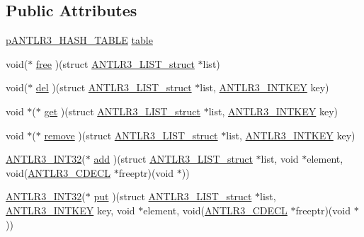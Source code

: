 \subsection*{Public Attributes}
\begin{DoxyCompactItemize}
\item 
\hyperlink{antlr3interfaces_8h_a8fd297514ac4bb022d25b65da9954adb}{p\-A\-N\-T\-L\-R3\-\_\-\-H\-A\-S\-H\-\_\-\-T\-A\-B\-L\-E} \hyperlink{struct_a_n_t_l_r3___l_i_s_t__struct_a15b368e87b7d31281b6f8c45abdbbe49}{table}
\item 
void($\ast$ \hyperlink{struct_a_n_t_l_r3___l_i_s_t__struct_a40cf49789eec6942fd248cb21f5c19ec}{free} )(struct \hyperlink{struct_a_n_t_l_r3___l_i_s_t__struct}{A\-N\-T\-L\-R3\-\_\-\-L\-I\-S\-T\-\_\-struct} $\ast$list)
\item 
void($\ast$ \hyperlink{struct_a_n_t_l_r3___l_i_s_t__struct_a5f19ce534e2425ed9e4e1f4ca35d198a}{del} )(struct \hyperlink{struct_a_n_t_l_r3___l_i_s_t__struct}{A\-N\-T\-L\-R3\-\_\-\-L\-I\-S\-T\-\_\-struct} $\ast$list, \hyperlink{antlr3defs_8h_aa5533fd558adc28dc2af0039f52324a8}{A\-N\-T\-L\-R3\-\_\-\-I\-N\-T\-K\-E\-Y} key)
\item 
void $\ast$($\ast$ \hyperlink{struct_a_n_t_l_r3___l_i_s_t__struct_ae8b4a02c7bb9cd4921cef90fd5e7a304}{get} )(struct \hyperlink{struct_a_n_t_l_r3___l_i_s_t__struct}{A\-N\-T\-L\-R3\-\_\-\-L\-I\-S\-T\-\_\-struct} $\ast$list, \hyperlink{antlr3defs_8h_aa5533fd558adc28dc2af0039f52324a8}{A\-N\-T\-L\-R3\-\_\-\-I\-N\-T\-K\-E\-Y} key)
\item 
void $\ast$($\ast$ \hyperlink{struct_a_n_t_l_r3___l_i_s_t__struct_a6055530ad64fac8d110fd3ea3c5b9f9b}{remove} )(struct \hyperlink{struct_a_n_t_l_r3___l_i_s_t__struct}{A\-N\-T\-L\-R3\-\_\-\-L\-I\-S\-T\-\_\-struct} $\ast$list, \hyperlink{antlr3defs_8h_aa5533fd558adc28dc2af0039f52324a8}{A\-N\-T\-L\-R3\-\_\-\-I\-N\-T\-K\-E\-Y} key)
\item 
\hyperlink{antlr3defs_8h_a6faef5c4687f8eb633d2aefea93973ca}{A\-N\-T\-L\-R3\-\_\-\-I\-N\-T32}($\ast$ \hyperlink{struct_a_n_t_l_r3___l_i_s_t__struct_a65dd3a65b4b1582ca87178300b030a77}{add} )(struct \hyperlink{struct_a_n_t_l_r3___l_i_s_t__struct}{A\-N\-T\-L\-R3\-\_\-\-L\-I\-S\-T\-\_\-struct} $\ast$list, void $\ast$element, void(\hyperlink{antlr3defs_8h_a91c919dd260a95cc88a0cd9b5c0a11cc}{A\-N\-T\-L\-R3\-\_\-\-C\-D\-E\-C\-L} $\ast$freeptr)(void $\ast$))
\item 
\hyperlink{antlr3defs_8h_a6faef5c4687f8eb633d2aefea93973ca}{A\-N\-T\-L\-R3\-\_\-\-I\-N\-T32}($\ast$ \hyperlink{struct_a_n_t_l_r3___l_i_s_t__struct_acd33ea9160558c5bf44a6aa23f5a514c}{put} )(struct \hyperlink{struct_a_n_t_l_r3___l_i_s_t__struct}{A\-N\-T\-L\-R3\-\_\-\-L\-I\-S\-T\-\_\-struct} $\ast$list, \hyperlink{antlr3defs_8h_aa5533fd558adc28dc2af0039f52324a8}{A\-N\-T\-L\-R3\-\_\-\-I\-N\-T\-K\-E\-Y} key, void $\ast$element, void(\hyperlink{antlr3defs_8h_a91c919dd260a95cc88a0cd9b5c0a11cc}{A\-N\-T\-L\-R3\-\_\-\-C\-D\-E\-C\-L} $\ast$freeptr)(void $\ast$))

\end{DoxyCompactItemize}
